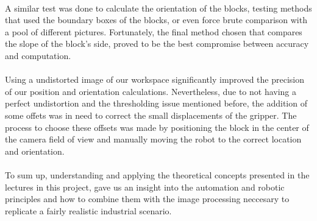 \paragraph{} A similar test was done to calculate the orientation of the blocks, testing methods that used the boundary boxes of the blocks, or even force brute comparison with a pool of different pictures. Fortunately, the final method chosen that compares the slope of the block's side, proved to be the best compromise between accuracy and computation.

\paragraph{} Using a undistorted image of our workspace significantly improved the precision of our position and orientation calculations. Nevertheless, due to not having a perfect undistortion and the thresholding issue mentioned before, the addition of some offets was in need to correct the small displacements of the gripper. 
The process to choose these offsets was made by positioning the block in the center of the camera field of view and manually moving the robot to the correct location and orientation.

\paragraph{} To sum up, understanding and applying the theoretical concepts presented in the lectures in this project, gave us an insight into the automation and robotic principles and how to combine them with the image processing neccesary to replicate a fairly realistic industrial scenario.